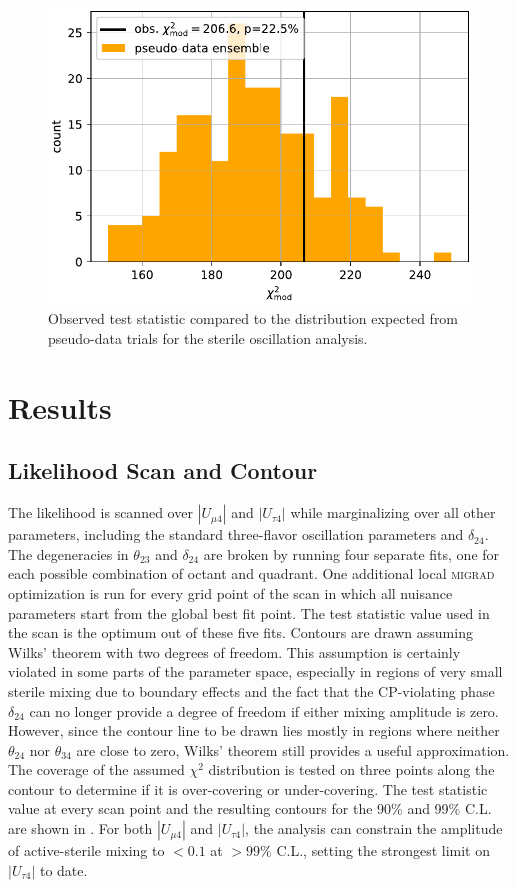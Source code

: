 \begin{figure}
    \centering
    \includegraphics[width=0.8\linewidth]{figures/measurement/sterile_analysis/results/compare_ts_to_ensemble_REAL_DATA_FIT_v12_ext_holeice.pdf}
    \caption{Observed test statistic compared to the distribution expected from pseudo-data trials for the sterile oscillation analysis.}
    \label{fig:sterile-modchi2-ensemble-comparison}
\end{figure}

\section{Results}

\subsection{Likelihood Scan and Contour}
The likelihood is scanned over $|U_{\mu 4}|$ and $|U_{\tau 4}|$ while marginalizing over all other parameters, including the standard three-flavor oscillation parameters and $\delta_{24}$. The degeneracies in $\theta_{23}$ and $\delta_{24}$ are broken by running four separate fits, one for each possible combination of octant and quadrant. One additional local \textsc{migrad} optimization is run for every grid point of the scan in which all nuisance parameters start from the global best fit point. The test statistic value used in the scan is the optimum out of these five fits. Contours are drawn assuming Wilks' theorem with two degrees of freedom. This assumption is certainly violated in some parts of the parameter space, especially in regions of very small sterile mixing due to boundary effects and the fact that the CP-violating phase $\delta_{24}$ can no longer provide a degree of freedom if either mixing amplitude is zero. However, since the contour line to be drawn lies mostly in regions where neither $\theta_{24}$ nor $\theta_{34}$ are close to zero, Wilks' theorem still provides a useful approximation. The coverage of the assumed $\chi^2$ distribution is tested on three points along the contour to determine if it is over-covering or under-covering. The test statistic value at every scan point and the resulting contours for the 90\% and 99\% C.L. are shown in . For both $|U_{\mu 4}|$ and $|U_{\tau 4}|$, the analysis can constrain the amplitude of active-sterile mixing to $<0.1$ at $>99\%$ C.L., setting the strongest limit on $|U_{\tau 4}|$ to date. 

